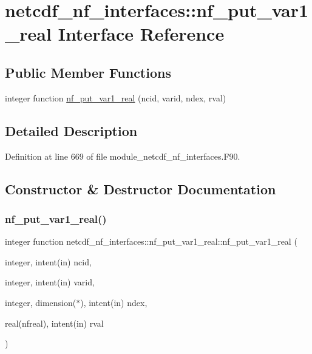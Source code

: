 \hypertarget{interfacenetcdf__nf__interfaces_1_1nf__put__var1__real}{}\section{netcdf\+\_\+nf\+\_\+interfaces\+:\+:nf\+\_\+put\+\_\+var1\+\_\+real Interface Reference}
\label{interfacenetcdf__nf__interfaces_1_1nf__put__var1__real}
\subsection*{Public Member Functions}
\begin{DoxyCompactItemize}
\item 
integer function \hyperlink{interfacenetcdf__nf__interfaces_1_1nf__put__var1__real_a86a84d04a27c47786c19654800edd7f0}{nf\+\_\+put\+\_\+var1\+\_\+real} (ncid, varid, ndex, rval)
\end{DoxyCompactItemize}


\subsection{Detailed Description}


Definition at line 669 of file module\+\_\+netcdf\+\_\+nf\+\_\+interfaces.\+F90.



\subsection{Constructor \& Destructor Documentation}
\mbox{\label{interfacenetcdf__nf__interfaces_1_1nf__put__var1__real_a86a84d04a27c47786c19654800edd7f0}} 
\subsubsection{\texorpdfstring{nf\+\_\+put\+\_\+var1\+\_\+real()}{nf\_put\_var1\_real()}}
{\footnotesize\ttfamily integer function netcdf\+\_\+nf\+\_\+interfaces\+::nf\+\_\+put\+\_\+var1\+\_\+real\+::nf\+\_\+put\+\_\+var1\+\_\+real (\begin{DoxyParamCaption}\item[{integer, intent(in)}]{ncid,  }\item[{integer, intent(in)}]{varid,  }\item[{integer, dimension($\ast$), intent(in)}]{ndex,  }\item[{real(nfreal), intent(in)}]{rval }\end{DoxyParamCaption})}



